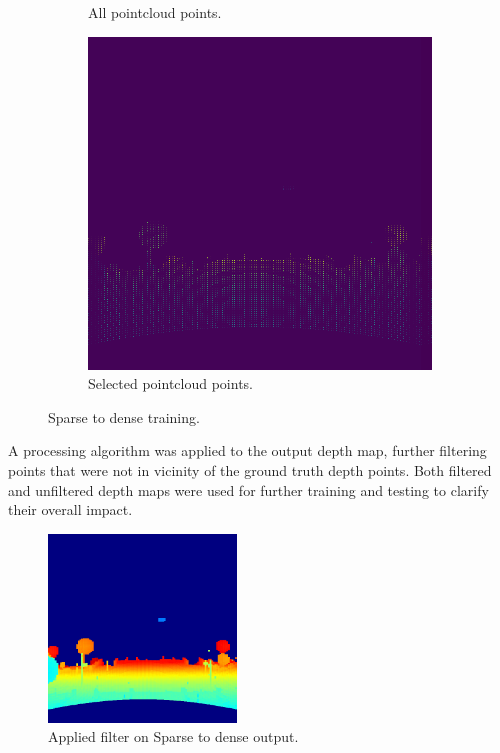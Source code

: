 \documentclass[twoside]{ctuthesis}
\theoremstyle{plain}
\theoremstyle{definition}
\theoremstyle{note}
\begin{document}
\begin{figure}
\begin{subfigure}[b]{0.4\textwidth}
		\caption{All pointcloud points.}
	\end{subfigure}
	\hfill
	\begin{subfigure}[b]{0.4\textwidth}
		\centering
		\includegraphics[width=\textwidth]{s2d_select.png}
		\caption{Selected pointcloud points.}
	\end{subfigure}
	\caption{Sparse to dense training.}
\end{figure}
A processing algorithm was applied to the output depth map, further filtering points that were not in vicinity of the ground truth depth points. Both filtered and unfiltered depth maps were used for further training and testing to clarify their overall impact.
\begin{figure}[h!]
	\centering
	\includegraphics[width=5cm]{sparse2dense_filter.png}
	\caption{Applied filter on Sparse to dense output.}
\end{figure}
\end{document}
